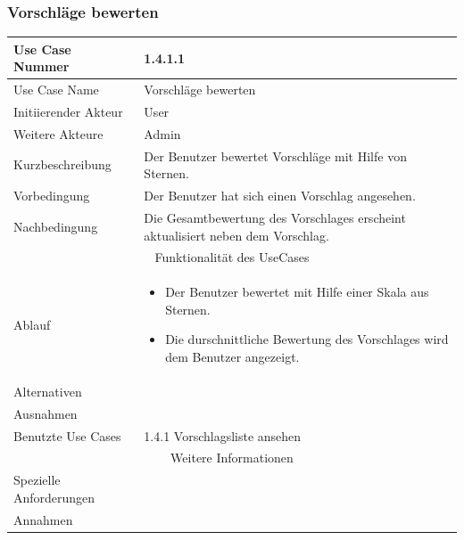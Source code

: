 \documentclass[10pt,a4paper]{article}
\begin{document}
	\subsubsection{Vorschl\"age bewerten}
	\begin{tabular}{|l|p{.5\linewidth}|}
		\hline Use Case Nummer & 1.4.1.1 \\ 
		\hline Use Case Name & Vorschl\"age bewerten \\ 
		\hline Initiierender Akteur & User \\
		\hline Weitere Akteure & Admin\\
		\hline Kurzbeschreibung & Der Benutzer bewertet Vorschl\"age mit Hilfe von Sternen. \\
		\hline Vorbedingung & Der Benutzer hat sich einen Vorschlag angesehen. \\
		\hline Nachbedingung & Die Gesamtbewertung des Vorschlages erscheint aktualisiert neben dem Vorschlag. \\
		\hline \multicolumn{2}{|c|}{Funktionalität des UseCases}\\
		\hline Ablauf & \begin{itemize}
			\item Der Benutzer bewertet mit Hilfe einer Skala aus Sternen.
			\item Die durschnittliche Bewertung des Vorschlages wird dem Benutzer angezeigt.
		\end{itemize} \\
		\hline Alternativen &  \\
		\hline Ausnahmen &  \\
		\hline Benutzte Use Cases & 1.4.1 Vorschlagsliste ansehen \\
		\hline \multicolumn{2}{|c|}{Weitere Informationen} \\
		\hline Spezielle Anforderungen &  \\
		\hline Annahmen &  \\
		\hline
	\end{tabular}
	
\end{document}
